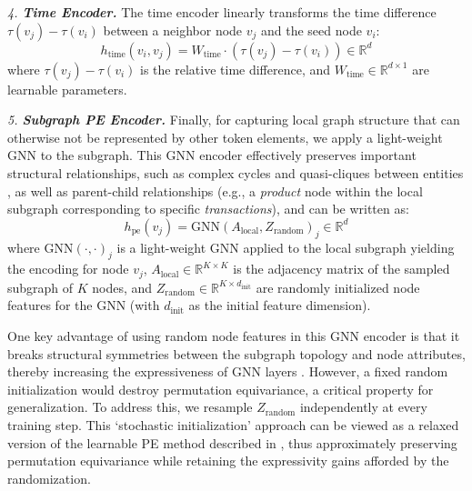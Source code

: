 \documentclass{article} %
\begin{document}
\textit{4. \textbf{Time Encoder.}}
The time encoder linearly transforms the time difference $\tau(v_j) - \tau(v_i)$ between a neighbor node $v_j$ and the seed node $v_i$:
\begin{equation}
  h_{\text{time}}(v_i, v_j) = W_{\text{time}} \cdot (\tau(v_j) - \tau(v_i)) \in \mathbb{R}^d \label{eq:time_enc_sep}
\end{equation}
where $\tau(v_j) - \tau(v_i)$ is the relative time difference, and $W_{\text{time}} \in \mathbb{R}^{d \times 1}$ are learnable parameters.

\textit{5. \textbf{Subgraph PE Encoder.}}
Finally, for capturing local graph structure that can otherwise not be represented by other token elements, we apply a light-weight GNN to the subgraph. This GNN encoder effectively preserves important structural relationships, such as complex cycles and quasi-cliques between entities \citep{kanatsoulis2024counting}, as well as parent-child relationships (e.g., a \textit{product} node within the 
local 
subgraph corresponding to specific \textit{transactions}), and can be written as:
\begin{equation}
  h_{\text{pe}}(v_j) = \text{GNN}(A_{\text{local}}, Z_{\text{random}})_j \in \mathbb{R}^d \label{eq:pe_enc_sep}
\end{equation}
where $\text{GNN}(\cdot, \cdot)_j$ is a light-weight GNN applied to the local subgraph yielding the encoding for node $v_j$, $A_{\text{local}} \in \mathbb{R}^{K \times K}$ is the adjacency matrix of the sampled subgraph of $K$ nodes, and $Z_{\text{random}} \in \mathbb{R}^{K \times d_{\text{init}}}$ are randomly initialized node features for the GNN (with $d_{\text{init}}$ as the initial feature dimension). 

One key advantage of using random node features in this GNN encoder is that it breaks structural symmetries between the subgraph topology and node attributes, thereby increasing the expressiveness of GNN layers \citep{sato2021random}. However, a fixed random initialization would destroy permutation equivariance, a critical property for generalization. To address this,
we resample $Z_{\text{random}}$ independently at every training step. This `stochastic initialization' approach can be viewed as a relaxed version of the learnable PE method described in \cite{kanatsoulis2025learning}, thus approximately preserving permutation equivariance while retaining the expressivity gains afforded by the randomization.
\end{document}
